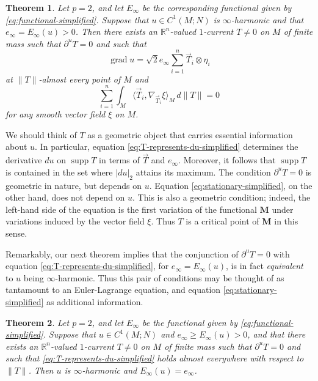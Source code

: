 \documentclass[a4paper]{article}
\newcommand{\R}{\mathbb{R}}
\newcommand{\M}{\mathbf{M}}
\DeclareMathOperator{\supp}{supp}
\DeclareMathOperator{\grad}{grad}
\newcommand{\smallscp}[2]{\langle #1, #2 \rangle}
\newtheorem{theorem}{Theorem}
\theoremstyle{definition}
\theoremstyle{remark}
\begin{document}
\begin{theorem} \label{thm:geodesic-simplified}
Let $p = 2$, and let $E_\infty$ be the corresponding functional given by \eqref{eq:functional-simplified}. Suppose that $u \in C^1(M; N)$ is $\infty$-harmonic and that $e_\infty = E_\infty(u) > 0$.
Then there exists an $\R^n$-valued $1$-current $T \neq 0$ on $M$ of finite mass such that $\partial^u T = 0$ and such that
\begin{equation} \label{eq:T-represents-du-simplified}
\grad u = \sqrt{2} e_\infty \sum_{i = 1}^n \vec{T}_i \otimes \eta_i
\end{equation}
at $\|T\|$-almost every point of $M$ and
\begin{equation} \label{eq:stationary-simplified}
\sum_{i = 1}^n \int_M \smallscp{\vec{T}_i}{\nabla_{\vec{T}_i} \xi}_M \, d\|T\| = 0
\end{equation}
for any smooth vector field $\xi$ on $M$.
\end{theorem}

We should think of $T$ as a geometric object that carries essential information
about $u$. In particular, equation \eqref{eq:T-represents-du-simplified} determines the
derivative $du$ on $\supp T$ in terms of $\vec{T}$ and $e_\infty$. Moreover,
it follows that $\supp T$ is contained in the set where $|du|_2$ attains its
maximum. The condition $\partial^u T = 0$ is geometric in nature, but depends
on $u$. Equation \eqref{eq:stationary-simplified}, on the other hand, does
not depend on $u$. This is also a geometric condition; indeed, the left-hand
side of the equation is the first variation of the functional $\M$ under variations induced by the vector field $\xi$. Thus $T$ is a critical point of $\M$ in this sense.

Remarkably, our next theorem implies that the conjunction of $\partial^u T = 0$
with equation \eqref{eq:T-represents-du-simplified}, for $e_\infty = E_\infty(u)$,
is in fact \emph{equivalent} to $u$ being
$\infty$-harmonic. Thus this pair of conditions may be thought of as
tantamount to an Euler-Lagrange equation, and equation \eqref{eq:stationary-simplified} as additional information.

\begin{theorem} \label{thm:equivalence-simplified}
Let $p = 2$, and let $E_\infty$ be the functional given by \eqref{eq:functional-simplified}. Suppose that
$u \in C^1(M; N)$ and $e_\infty \ge E_\infty(u) > 0$, and that
there exists an $\R^n$-valued $1$-current $T \neq 0$ on $M$ of finite mass such that
$\partial^u T = 0$ and such that \eqref{eq:T-represents-du-simplified} holds almost everywhere with respect to $\|T\|$.
Then $u$ is $\infty$-harmonic and $E_\infty(u) = e_\infty$.
\end{theorem}
\end{document}
